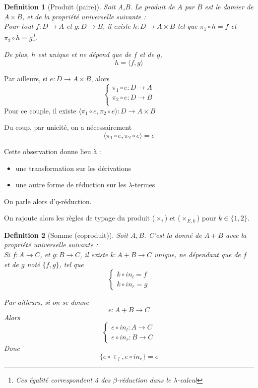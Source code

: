 \documentclass{article}
\newtheorem{defi}{Definition}
\newcommand\tlambda[0]{$\lambda$}
\begin{document}
\begin{defi}[Produit (paire)]
Soit A,B. Le produit de $A$ par $B$ est le damier de $A\times B$, et de la propriété universelle suivante :\\
Pour tout $f : D \to A$ et $g : D\to B$, il existe $h : D\to A\times B$ tel que $\pi_1 \circ h = f$ et $\pi_2 \circ h = g$\footnote{Ces égalité correspondent à des $\beta$-réduction dans le \tlambda-calcul}.

De plus, $h$ est \emph{unique} et ne dépend que de $f$ et de $g$,
\[h = \langle f, g \rangle\]
\end{defi}

Par ailleurs, si $e : D \to A \times B$, alors 
\[
\begin{cases}
\pi_1 \circ e : D \to A\\
\pi_2 \circ e : D \to B\\
\end{cases}
\]
Pour ce couple, il existe $\langle \pi_1 \circ e, \pi_2 \circ e\rangle : D \to A \times B$

Du coup, par unicité, on a nécessairement
\[\langle \pi_1 \circ e, \pi_2 \circ e\rangle = e \]

Cette observation donne lieu à :
\begin{itemize}
\item une transformation sur les dérivations
\item une autre forme de réduction sur les \tlambda-termes
\end{itemize}
On parle alors d'$\eta$-réduction.

\bigskip

On rajoute alors les règles de typage du produit ($\times_i$) et ($\times_{E,k}$) pour $k\in \{1,2\}$.


\begin{defi}[Somme (coproduit)]
Soit $A,B$. C'est la donné de $A + B$ avec la propriété universelle suivante :\\
Si $f : A \to C$, et $g : B \to C$, il existe $k : A + B \to C$ unique, ne dépendant que de $f$ et de $g$ noté $\{ f, g \}$, tel que 
\[
\begin{cases}
k \circ in_l = f\\
k \circ in_r = g
\end{cases}
\]

Par ailleurs, si on se donne
\[e : A + B \to C\]
Alors
\[
\begin{cases}
e \circ in_l : A \to C\\
e \circ in_r : B \to C
\end{cases}
\]
Donc 
\[\{ e \circ \in_l, e \circ in_r\} = e\]
\end{defi}
\end{document}
